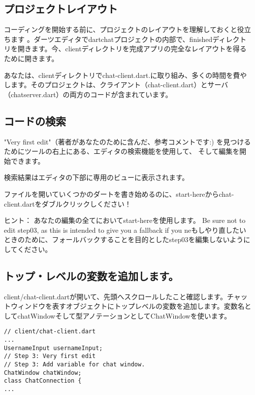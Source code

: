 \subsection{プロジェクトレイアウト}

コーディングを開始する前に、プロジェクトのレイアウトを理解しておくと役立ちます
。ダーツエディタでdartchatプロジェクトの内部で、finishedディレクトリを開きます。今、clientディレクトリを完成アプリの完全なレイアウトを得るために開きます。


あなたは、clientディレクトリでchat-client.dart.に取り組み、多くの時間を費やします。そのプロジェクトは、クライアント（chat-client.dart）とサーバ（chatserver.dart）の両方のコードが含まれています。

\subsection{コードの検索}

"Very first edit"（著者があなたのために含んだ、参考コメントです:)
を見つけるためにツールの右上にある、エディタの検索機能を使用して、
そして編集を開始できます。


検索結果はエディタの下部に専用のビューに表示されます。


ファイルを開いていくつかのダートを書き始めるのに、start-hereからchat-client.dartをダブルクリックしください！

ヒント： あなたの編集の全てにおいてstart-hereを使用します。 Be sure not to edit step03, as this is intended to give you a fallback if you neもしやり直したいときのために、フォールバックすることを目的としたstep03を編集しないようにしてください。

\subsection{トップ・レベルの変数を追加します。}

client/chat-client.dartが開いて、先頭へスクロールしたこと確認します。チャットウィンドウを表すオブジェクトにトップレベルの変数を追加します。変数名としてchatWindowそして型アノテーションとしてChatWindowを使います。

\begin{verbatim}
// client/chat-client.dart
...
UsernameInput usernameInput;
// Step 3: Very first edit
// Step 3: Add variable for chat window.
ChatWindow chatWindow;
class ChatConnection {
...
\end{verbatim}

